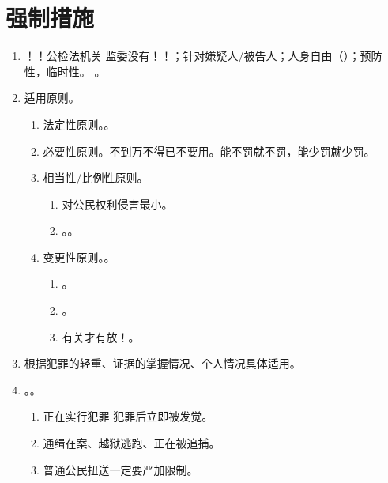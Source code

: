 \section{强制措施}
\begin{enumerate}
  \item {}！！公检法机关 \yjt 监委没有！！；针对嫌疑人/被告人；人身自由（）；预防性，临时性。
        。
  \item 适用原则。
        \begin{enumerate}
          \item 法定性原则。。
          \item 必要性原则。不到万不得已不要用。能不罚就不罚，能少罚就少罚。
          \item 相当性/比例性原则。
                \begin{enumerate}
                  \item 对公民权利侵害最小。
                  \item {}。。
                \end{enumerate}
          \item 变更性原则。。
                \begin{enumerate}
                  \item {}。
                  \item {}。
                  \item 有关才有放！。
                \end{enumerate}
        \end{enumerate}
  \item 根据犯罪的轻重、证据的掌握情况、个人情况具体适用。
  \item {}。。
        \begin{enumerate}
          \item 正在实行犯罪 \hz 犯罪后立即被发觉。
          \item 通缉在案、越狱逃跑、正在被追捕。
          \item 普通公民扭送一定要严加限制。
        \end{enumerate}
\end{enumerate}
